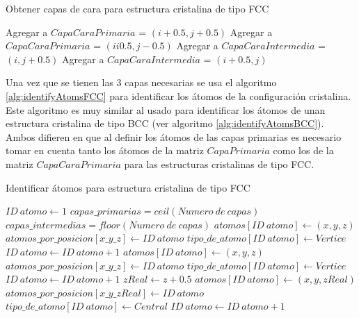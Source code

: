 \begin{algorithm}[ht]
  \caption{Obtener capas de cara para estructura cristalina de tipo FCC}
  \label{alg:FaceLayersFCC}
  \begin{algorithmic}[1]
          \STATE Agregar a $CapaCaraPrimaria$ = $(i + 0.5, j + 0.5)$
        \ENDIF
          \STATE Agregar a $CapaCaraPrimaria$ = $(i i 0.5, j - 0.5)$
        \ENDIF
          \STATE Agregar a $CapaCaraIntermedia$ = $(i, j + 0.5)$
        \ENDIF
          \STATE Agregar a $CapaCaraIntermedia$ = $(i + 0.5, j)$
        \ENDIF
      \ENDFOR
    \ENDFOR
  \end{algorithmic}
\end{algorithm}

Una vez que se tienen las 3 capas necesarias se usa el algoritmo \ref{alg:identifyAtomsFCC} para identificar los átomos de la configuración cristalina. Este algoritmo es muy similar al usado para identificar los átomos de unan estructura cristalina de tipo BCC (ver algoritmo \ref{alg:identifyAtomsBCC}). Ambos difieren en que al definir los átomos de las capas primarias es necesario tomar en cuenta tanto los átomos de la matriz $CapaPrimaria$ como los de la matriz $CapaCaraPrimaria$ para las estructuras cristalinas de tipo FCC.

\begin{algorithm}[ht]
  \caption{Identificar átomos para estructura cristalina de tipo FCC}
  \label{alg:identifyAtomsFCC}
  \begin{algorithmic}[1]
    \STATE $ID\ atomo \leftarrow 1$
    \STATE $capas\_primarias = ceil(Numero\ de\ capas)$
    \STATE $capas\_intermedias = floor(Numero\ de\ capas)$
        \STATE $atomos[ID\ atomo] \leftarrow (x, y, z)$
        \STATE $atomos\_por\_posicion[x\_y\_z] \leftarrow ID\ atomo$
        \STATE $tipo\_de\_atomo[ID\ atomo] \leftarrow Vertice$
        \STATE $ID\ atomo \leftarrow ID\ atomo + 1$
      \ENDFOR
        \STATE $atomos[ID\ atomo] \leftarrow (x, y, z)$
        \STATE $atomos\_por\_posicion[x\_y\_z] \leftarrow ID\ atomo$
        \STATE $tipo\_de\_atomo[ID\ atomo] \leftarrow Vertice$
        \STATE $ID\ atomo \leftarrow ID\ atomo + 1$
      \ENDFOR
    \ENDFOR
        \STATE $zReal \leftarrow z + 0.5$
        \STATE $atomos[ID\ atomo] \leftarrow (x, y, zReal)$
        \STATE $atomos\_por\_posicion[x\_y\_zReal] \leftarrow ID\ atomo$
        \STATE $tipo\_de\_atomo[ID\ atomo] \leftarrow Central$
        \STATE $ID\ atomo \leftarrow ID\ atomo + 1$
      \ENDFOR
    \ENDFOR
  \end{algorithmic}
\end{algorithm}

